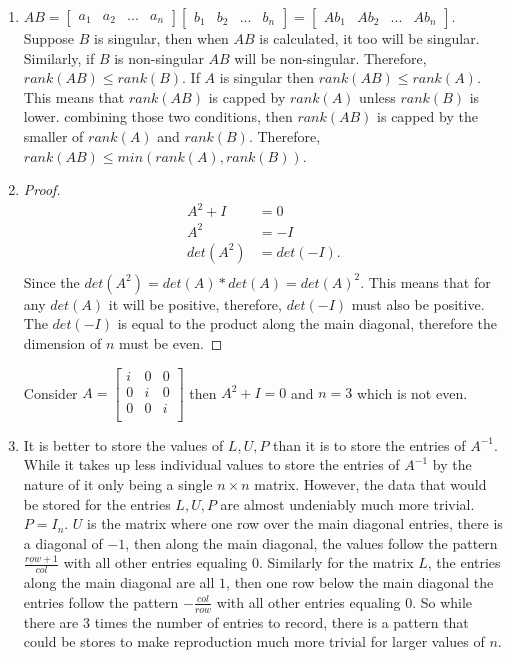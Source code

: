 \documentclass{article}
\begin{document}
\begin{enumerate}
    \item
    
    $AB = \begin{bmatrix}
    a_1 & a_2 & ... & a_n
    \end{bmatrix} \begin{bmatrix}
    b_1 & b_2 & ... & b_n
    \end{bmatrix} = \begin{bmatrix}
    Ab_1 & Ab_2 & ... & Ab_n
    \end{bmatrix}$. Suppose $B$ is singular, then when $AB$ is calculated, it too will be singular. Similarly, if $B$ is non-singular $AB$ will be non-singular. Therefore, $rank(AB) \leq rank(B)$. If $A$ is singular then $rank(AB) \leq rank(A)$. This means that $rank(AB)$ is capped by $rank(A)$ unless $rank(B)$ is lower. combining those two conditions, then $rank(AB)$ is capped by the smaller of $rank(A)$ and $rank(B)$. Therefore, $rank(AB) \leq min(rank(A), rank(B))$.
    
    \item
    
    \begin{proof}
    \begin{align*}
        A^2 + I &= 0\\
        A^2 &= -I\\
        det(A^2) &= det(-I).\\
    \end{align*}
    Since the $det(A^2) = det(A) * det(A) = det(A)^2$. This means that for any $det(A)$ it will be positive, therefore, $det(-I)$ must also be positive. The $det(-I)$ is equal to the product along the main diagonal, therefore the dimension of $n$ must be even.
    \end{proof}
    Consider $A = \begin{bmatrix}
    i & 0 & 0\\
    0 & i & 0\\
    0 & 0 & i\\
    \end{bmatrix}$ then $A^2+I=0$ and $n=3$ which is not even.
    
    \item
    
    It is better to store the values of $L, U, P$ than it is to store the entries of $A^{-1}$. While it takes up less individual values to store the entries of $A^{-1}$ by the nature of it only being a single $n\times n$ matrix. However, the data that would be stored for the entries $L, U, P$ are almost undeniably much more trivial. $P=I_n$. $U$ is the matrix where one row over the main diagonal entries, there is a diagonal of $-1$, then along the main diagonal, the values follow the pattern $\frac{row+1}{col}$ with all other entries equaling $0$. Similarly for the matrix $L$, the entries along the main diagonal are all $1$, then one row below the main diagonal the entries follow the pattern $-\frac{col}{row}$ with all other entries equaling $0$. So while there are $3$ times the number of entries to record, there is a pattern that could be stores to make reproduction much more trivial for larger values of $n$.
    
\end{enumerate}
\end{document}
